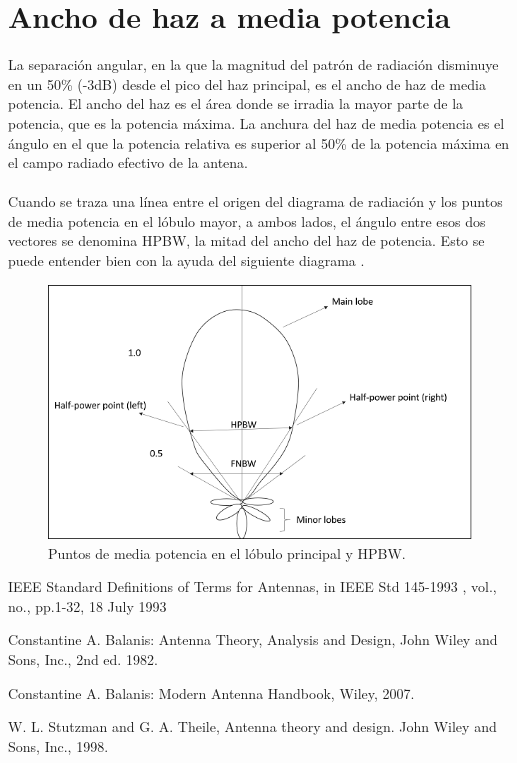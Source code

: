 \documentclass[12pt,letterpaper]{article}
\begin{document}
\section{Ancho de haz a media potencia}
La separación angular, en la que la magnitud del patrón de radiación disminuye en un 
50\% (-3dB) desde el pico del haz principal, es el ancho de haz de media potencia. El 
ancho del haz es el área donde se irradia la mayor parte de la potencia, que es la 
potencia máxima. La anchura del haz de media potencia es el ángulo en el que la potencia 
relativa es superior al 50\% de la potencia máxima en el campo radiado efectivo de la antena.
\\ \\
Cuando se traza una línea entre el origen del diagrama de radiación y los puntos de 
media potencia en el lóbulo mayor, a ambos lados, el ángulo entre esos dos vectores se 
denomina HPBW, la mitad del ancho del haz de potencia. Esto se puede entender bien con 
la ayuda del siguiente diagrama \cite{haz}.
\begin{figure}[ht]
    \centering
    \includegraphics[width=.8\textwidth]{hpbw.jpg}
    \caption{Puntos de media potencia en el lóbulo principal y HPBW.}
\end{figure}

\newpage
\begin{thebibliography}{20}
    IEEE Standard Definitions of Terms for Antennas, in IEEE Std 145-1993 , vol., no., pp.1-32, 18 July 1993

    Constantine A. Balanis: Antenna Theory, Analysis and Design, John Wiley and Sons, Inc., 2nd ed. 1982.
    
    Constantine A. Balanis: Modern Antenna Handbook, Wiley, 2007.

    W. L. Stutzman and G. A. Theile, Antenna theory and design. John Wiley and Sons, Inc., 1998.
\end{thebibliography}
\end{document}
